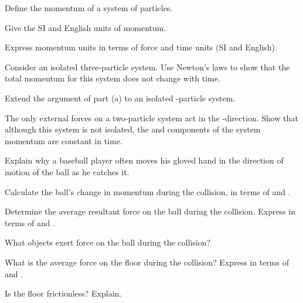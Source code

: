{{\begin{two-digit-list}
\item [1.] \NullItem
\begin{one-digit-list}
\item [a.] Define the momentum of a system of particles.
\item [b.] Give the SI and English units of momentum.
\item [c.] Express momentum units in terms of force and time units (SI and
           English). 
\end{one-digit-list}

\item [2.] \NullItem
\begin{one-digit-list}
\item [a.] Consider an isolated three-particle system.
           Use Newton's laws to show that the total momentum for this system
           does not change with time.
\item [b.] Extend the argument of part (a) to an isolated -particle
           system.  
\end{one-digit-list}

\item [3.] The only external forces on a two-particle system act in the
           -direction.
           Show that although this system is not isolated, the  and
            components of the system momentum are constant in time. 

\item [4.] Explain why a baseball player often moves his gloved hand in the
           direction of motion of the ball as he catches it. 

\item [5.] 

\begin{one-digit-list}
\item [a.] Calculate the ball's change in momentum during the collision, in
           terms of  and . 
\item [b.] Determine the average resultant force on the ball during the
           collision.
           Express in terms of  and . 
\item [c.] What objects exert force on the ball during the collision?
\item [d.] What is the average force on the floor during the collision?
           Express in terms of  and . 
\item [e.] Is the floor frictionless?
           Explain. 
\end{one-digit-list}


\end{two-digit-list}}}
